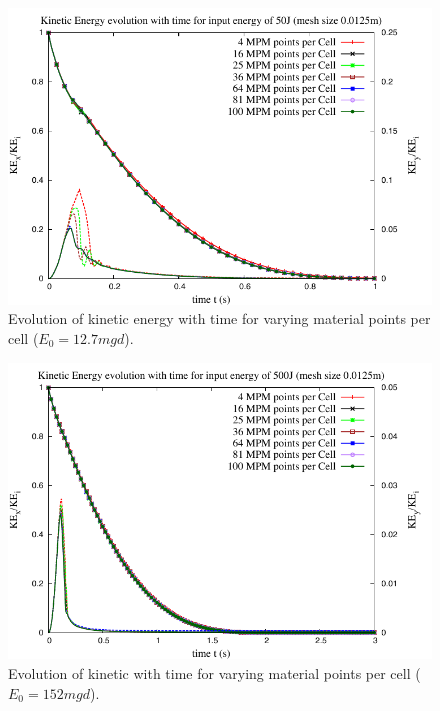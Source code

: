 \begin{figure}[tbhp]
\centering
\includegraphics[width=\textwidth]{KE_50}
\caption{Evolution of kinetic energy with time for varying material points per cell ($E_0=12.7mgd$).}
\label{fig:KE_50}
\end{figure}

\begin{figure}[tbhp]
\centering
\includegraphics[width=\textwidth]{KE_500}
\caption{Evolution of kinetic with time for varying material points per cell ($E_0=152mgd$).}
\label{fig:KE_500}
\end{figure}

